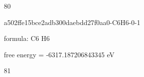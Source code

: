 \documentclass{article}
\begin{document}
80

\vspace{1cm}


a502ffe15bce2adb300daebdd27f0aa0-C6H6-0-1



formula: C6 H6



free energy = -6317.187206843345 eV

81
\end{document}
